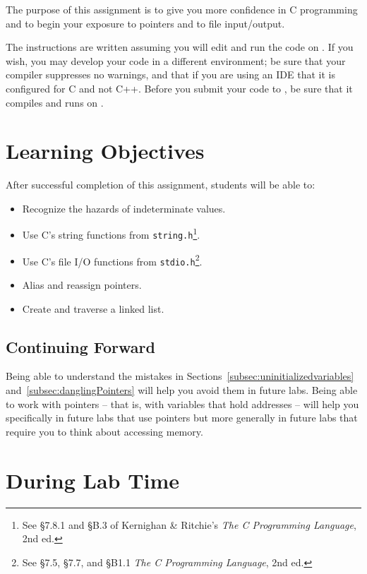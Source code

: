 The purpose of this assignment is to give you more confidence in C programming and to begin your exposure to pointers and to file input/output.

The instructions are written assuming you will edit and run the code on \runtimeenvironment.
If you wish, you may develop your code in a different environment;
be sure that your compiler suppresses no warnings, and that if you are using an IDE that it is configured for C and not C++.
Before you submit your code to \filesubmission, be sure that it compiles and runs on \runtimeenvironment.

\section*{Learning Objectives}

After successful completion of this assignment, students will be able to:
\begin{itemize}
    \item Recognize the hazards of indeterminate values.
    \item Use C's string functions from \lstinline{string.h}\footnote{\label{note:stringFunctions}See \S7.8.1 and \S{}B.3 of Kernighan \& Ritchie's \textit{The C Programming Language}, 2nd ed.}.
    \item Use C's file I/O functions from \lstinline{stdio.h}\footnote{See \S7.5, \S7.7, and \S{}B1.1 \textit{The C Programming Language}, 2nd ed.}.
    \item Alias and reassign pointers.
    \item Create and traverse a linked list.
\end{itemize}

\subsection*{Continuing Forward}

Being able to understand the mistakes in Sections~\ref{subsec:uninitializedvariables} and~\ref{subsec:danglingPointers} will help you avoid them in future labs.
Being able to work with pointers -- that is, with variables that hold addresses -- will help you specifically in future labs that use pointers but more generally in future labs that require you to think about accessing memory.

\section*{During Lab Time}

